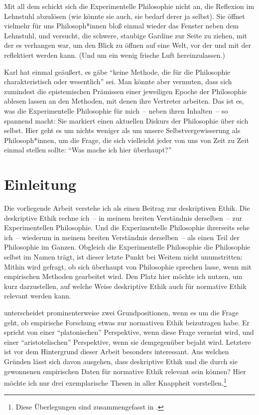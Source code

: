 \documentclass[justified,nobib,nohyper,symmetric,twoside]{tufte-book}
\begin{document}
Mit all dem schickt sich die Experimentelle Philosophie nicht an, die Reflexion im Lehnstuhl abzulösen (wie könnte sie auch, sie bedarf derer ja selbst).
Sie öffnet vielmehr für uns Philosoph*innen bloß einmal wieder das Fenster neben dem Lehnstuhl, und versucht, die schwere, staubige Gardine zur Seite zu ziehen, mit der es verhangen war, um den Blick zu öffnen auf eine Welt, vor der und mit der reflektiert werden kann.
(Und um ein wenig frische Luft hereinzulassen.)

Karl \citet[S.~XVI]{popper_logik_1966} hat einmal geäußert, es gäbe \enquote{keine Methode, die für die Philosophie charakteristisch oder wesentlich} sei.
Man könnte aber vermuten, dass sich zumindest die epistemischen Prämissen einer jeweiligen Epoche der Philosophie ablesen lassen an den Methoden, mit denen ihre Vertreter arbeiten.
Das ist es, was die Experimentelle Philosophie für mich~-- neben ihren Inhalten~-- so spannend macht: Sie markiert einen aktuellen Diskurs der Philosophie über sich selbst.
Hier geht es um nichts weniger als um unsere Selbstvergewisserung als Philosoph*innen, um die Frage, die sich vielleicht jeder von uns von Zeit zu Zeit einmal stellen sollte: \enquote{Was mache ich hier überhaupt?}


\mainmatter
\chapter{Einleitung}\label{ch:einleitung}
Die vorliegende Arbeit verstehe ich als einen Beitrag zur deskriptiven Ethik.
Die deskriptive Ethik rechne ich~-- in meinem breiten Verständnis derselben~-- zur Experimentellen Philosophie.
Und die Experimentelle Philosophie ihrerseits sehe ich~-- wiederum in meinem breiten Verständnis derselben~-- als einen Teil der Philosophie im Ganzen.
Obgleich die Experimentelle Philosophie die Philosophie selbst im Namen trägt, ist dieser letzte Punkt bei Weitem nicht unumstritten: Mithin wird gefragt, ob sich überhaupt von Philosophie sprechen lasse, wenn mit empirischen Methoden gearbeitet wird.
Den Platz hier möchte ich nutzen, um kurz darzustellen, auf welche Weise deskriptive Ethik auch für normative Ethik relevant werden kann.

\citet[S.~177ff.]{miller_review_1994} unterscheidet prominenterweise zwei Grundpositionen, wenn es um die Frage geht, ob empirische Forschung etwas zur normativen Ethik beizutragen habe.
Er spricht von einer \enquote{platonischen} Perspektive, wenn diese Frage verneint wird, und einer \enquote{aristotelischen} Perspektive, wenn sie demgegenüber bejaht wird.
Letztere ist vor dem Hintergrund dieser Arbeit besonders interessant.
Aus welchen Gründen lässt sich davon ausgehen, dass deskriptive Ethik und die durch sie gewonnenen empirischen Daten für normative Ethik relevant sein können?
Hier möchte ich nur drei exemplarische Thesen in aller Knappheit vorstellen.\footnote{Diese Überlegungen sind zusammengefasst in \citet{bauer_zwei_2019,bauer_two_2020}.}
\end{document}
